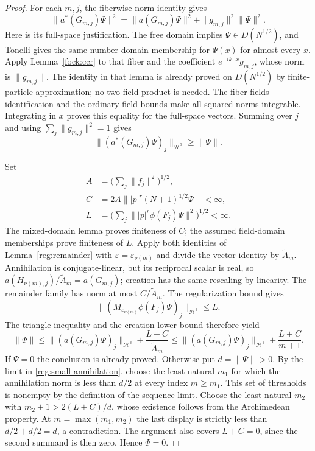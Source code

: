 \documentclass[11pt,a4paper]{article}
\theoremstyle{definition}
\theoremstyle{remark}
\begin{document}
\begin{proof}
For each $m,j$, the fiberwise norm identity gives
\[
 \|a^*(G_{m,j})\Psi\|^2
 =\|a(G_{m,j})\Psi\|^2+\|g_{m,j}\|^2\|\Psi\|^2.
\]
Here is its full-space justification. The free domain implies
$\Psi\in D(N^{1/2})$, and Tonelli gives the same number-domain
membership for $\Psi(x)$ for almost every $x$. Apply
Lemma~\ref{fock:ccr} to that fiber and the coefficient
$e^{-ik\cdot x}g_{m,j}$, whose norm is $\|g_{m,j}\|$.
The identity in that lemma is already proved on $D(N^{1/2})$
by finite-particle approximation; no two-field product is needed.
The fiber-fields identification and the ordinary field bounds
make all squared norms integrable. Integrating in $x$ proves
this equality for the full-space vectors. Summing over $j$ and
using $\sum_j\|g_{m,j}\|^2=1$ gives
\begin{equation}
 \|(a^*(G_{m,j})\Psi)_j\|_{\mathcal H^3}\geq\|\Psi\|.
 \label{reg:large-creation}
\end{equation}

Set
\begin{align*}
 A&=\Big(\sum_j\|f_j\|^2\Big)^{1/2},\\
 C&=2A\||p|^r(N+1)^{1/2}\Psi\|<\infty,\\
 L&=\Big(\sum_j\||p|^r\phi(F_j)\Psi\|^2\Big)^{1/2}<\infty.
\end{align*}
The mixed-domain lemma proves finiteness of $C$; the assumed
field-domain memberships prove finiteness of $L$. Apply both
identities of Lemma~\ref{reg:remainder} with
$\varepsilon=\varepsilon_{\nu(m)}$ and divide the vector
identity by $\widetilde A_m$. Annihilation is conjugate-linear,
but its reciprocal scalar is real, so
$a(H_{\nu(m),j})/\widetilde A_m=a(G_{m,j})$; creation has
the same rescaling by linearity. The remainder family has norm
at most $C/\widetilde A_m$. The regularization bound gives
\[
 \|(M_{\varepsilon_{\nu(m)}}\phi(F_j)\Psi)_j\|_{\mathcal H^3}
       \leq L.
\]
The triangle inequality and the creation lower bound therefore yield
\[
 \|\Psi\|\leq
 \|(a(G_{m,j})\Psi)_j\|_{\mathcal H^3}
                +\frac{L+C}{\widetilde A_m}
 \leq\|(a(G_{m,j})\Psi)_j\|_{\mathcal H^3}
                +\frac{L+C}{m+1}.
\]
If $\Psi=0$ the conclusion is already proved. Otherwise put
$d=\|\Psi\|>0$. By the limit in
\eqref{reg:small-annihilation}, choose the least natural $m_1$
for which the annihilation norm is less than $d/2$ at every
index $m\geq m_1$. This set of thresholds is nonempty by the
definition of the sequence limit. Choose the least natural $m_2$
with $m_2+1>2(L+C)/d$, whose existence follows from the
Archimedean property. At $m=\max(m_1,m_2)$ the last display
is strictly less than $d/2+d/2=d$, a contradiction. The
argument also covers $L+C=0$, since the second summand is then
zero. Hence $\Psi=0$.
\end{proof}
\end{document}
